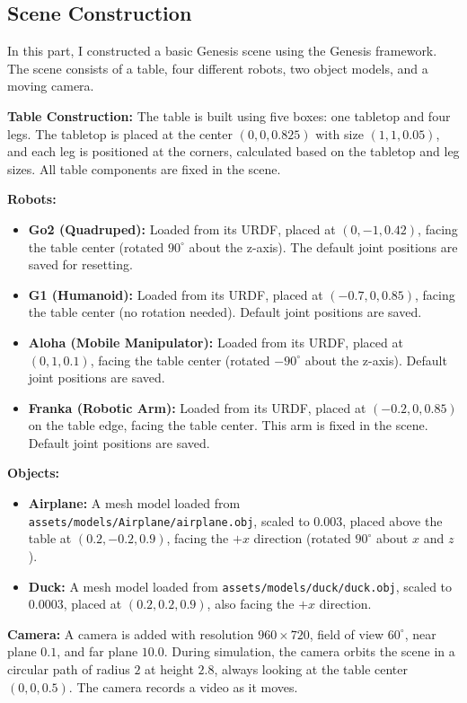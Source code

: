 \documentclass[UTF8]{ctexart}
\begin{document}
\subsection{Scene Construction}
In this part, I constructed a basic Genesis scene using the Genesis framework. The scene consists of a table, four different robots, two object models, and a moving camera.

	\textbf{Table Construction:} The table is built using five boxes: one tabletop and four legs. The tabletop is placed at the center $(0, 0, 0.825)$ with size $(1, 1, 0.05)$, and each leg is positioned at the corners, calculated based on the tabletop and leg sizes. All table components are fixed in the scene.

	\textbf{Robots:}
\begin{itemize}
    \item \textbf{Go2 (Quadruped):} Loaded from its URDF, placed at $(0, -1, 0.42)$, facing the table center (rotated $90^\circ$ about the z-axis). The default joint positions are saved for resetting.
    \item \textbf{G1 (Humanoid):} Loaded from its URDF, placed at $(-0.7, 0, 0.85)$, facing the table center (no rotation needed). Default joint positions are saved.
    \item \textbf{Aloha (Mobile Manipulator):} Loaded from its URDF, placed at $(0, 1, 0.1)$, facing the table center (rotated $-90^\circ$ about the z-axis). Default joint positions are saved.
    \item \textbf{Franka (Robotic Arm):} Loaded from its URDF, placed at $(-0.2, 0, 0.85)$ on the table edge, facing the table center. This arm is fixed in the scene. Default joint positions are saved.
\end{itemize}

	\textbf{Objects:}
\begin{itemize}
    \item \textbf{Airplane:} A mesh model loaded from \texttt{assets/models/Airplane/airplane.obj}, scaled to $0.003$, placed above the table at $(0.2, -0.2, 0.9)$, facing the $+x$ direction (rotated $90^\circ$ about $x$ and $z$).
    \item \textbf{Duck:} A mesh model loaded from \texttt{assets/models/duck/duck.obj}, scaled to $0.0003$, placed at $(0.2, 0.2, 0.9)$, also facing the $+x$ direction.
\end{itemize}

	\textbf{Camera:} A camera is added with resolution $960\times720$, field of view $60^\circ$, near plane $0.1$, and far plane $10.0$. During simulation, the camera orbits the scene in a circular path of radius $2$ at height $2.8$, always looking at the table center $(0, 0, 0.5)$. The camera records a video as it moves.
\end{document}
